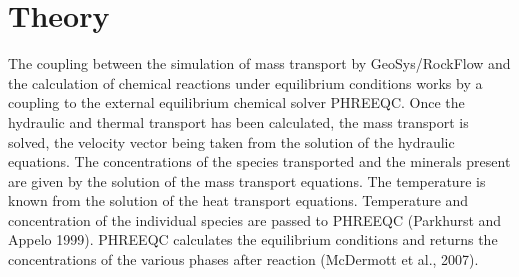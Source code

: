 
\section{Theory}

The coupling between the simulation of mass transport by GeoSys/RockFlow and the calculation of chemical reactions under equilibrium conditions works by a coupling to the external equilibrium chemical solver PHREEQC.
Once the hydraulic and thermal transport has been calculated, the mass transport is solved, the velocity vector being taken from the solution of the hydraulic equations. The concentrations of the species transported and the minerals present are given by the solution of the mass transport equations. The temperature is known from the solution of the heat transport equations. Temperature and concentration of the individual species are passed to PHREEQC (Parkhurst and Appelo 1999). PHREEQC calculates the equilibrium conditions and returns the concentrations of the various phases after reaction (McDermott et al., 2007).
